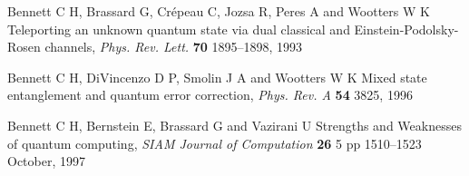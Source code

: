 \documentclass{article}
\begin{document}
\begin{thebibliography}{12}
Bennett C H, Brassard G, Cr\'epeau C, Jozsa R, Peres A and
Wootters W K 
Teleporting an unknown quantum state via dual classical and
Einstein-Podolsky-Rosen channels,
{\em Phys. Rev. Lett.} {\bf 70} 1895--1898, 1993




Bennett C H, DiVincenzo D P, Smolin J A
and Wootters W K 
Mixed state entanglement and quantum error correction, 
{\em Phys. Rev. A} {\bf 54} 3825, 1996 

Bennett C H, Bernstein E, Brassard G and Vazirani U 
Strengths and Weaknesses of quantum computing,
{\em SIAM Journal of Computation}
{\bf 26} 5 pp 1510--1523 October, 1997  

% 
% 
% 
% 
% 
% 
% 
% 
% 
% 
% 
% 
% 
% 
% 
% 
% 


\end{thebibliography}
\end{document}

